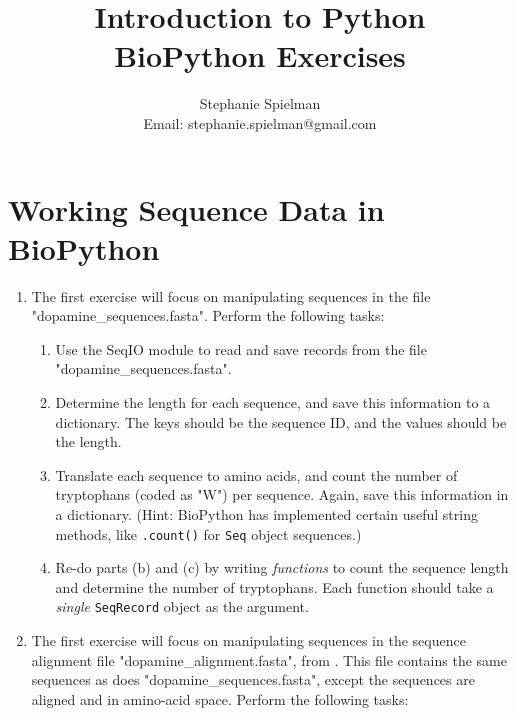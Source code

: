 \documentclass{article}[12pt]
\newcommand{\code}[1]{\texttt{#1}}  %
\begin{document}
\title{Introduction to Python \\ BioPython Exercises}
\author{Stephanie Spielman \\ \footnotesize{Email: stephanie.spielman@gmail.com}}
\date{}
\maketitle{}

\section*{Working Sequence Data in BioPython}


\begin{enumerate}[itemsep=5ex]

	\item The first exercise will focus on manipulating sequences in the file "dopamine\_sequences.fasta". Perform the following tasks:
	
	\begin{enumerate}[itemsep=2ex]
		\item Use the SeqIO module to read and save records from the file "dopamine\_sequences.fasta".
		\item Determine the length for each sequence, and save this information to a dictionary. The keys should be the sequence ID, and the values should be the length.
		\item Translate each sequence to amino acids, and count the number of tryptophans (coded as "W") per sequence. Again, save this information in a dictionary. (Hint: BioPython has implemented certain useful string methods, like \code{.count()} for \code{Seq} object sequences.)
		\item Re-do parts (b) and (c) by writing \emph{functions} to count the sequence length and determine the number of tryptophans. Each function should take a \emph{single} \code{SeqRecord} object as the argument.
		
		
	\end{enumerate}
	
	\item The first exercise will focus on manipulating sequences in the sequence alignment file "dopamine\_alignment.fasta", from \citet{SpielmanKumarWilke2015}. This file contains the same sequences as does "dopamine\_sequences.fasta", except the sequences are aligned and in amino-acid space. Perform the following tasks:
		

\end{enumerate}
\end{document}
